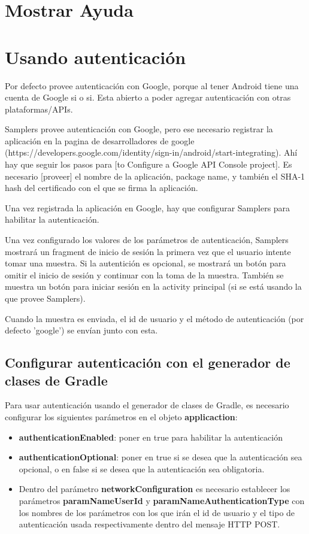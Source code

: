 \section{Mostrar Ayuda}

\section{Usando autenticación} \label{sec:usando_autenticacion}
Por defecto provee autenticación con Google, porque al tener Android tiene una cuenta de Google si o si.
Esta abierto a poder agregar autenticación con otras plataformas/APIs.

Samplers provee autenticación con Google, pero ese necesario registrar la aplicación en la pagina de desarrolladores de google (https://developers.google.com/identity/sign-in/android/start-integrating). Ahí hay que seguir los pasos para [to Configure a Google API Console project]. Es necesario [proveer] el nombre de la aplicación, package name, y también el SHA-1 hash del certificado con el que se firma la aplicación.

Una vez registrada la aplicación en Google, hay que configurar Samplers para habilitar la autenticación.

Una vez configurado los valores de los parámetros de autenticación, Samplers mostrará un fragment de inicio de sesión la primera vez que el usuario intente tomar una muestra. Si la autentición es opcional, se mostrará un botón para omitir el inicio de sesión y continuar con la toma de la muestra. También se muestra un botón para iniciar sesión en la activity principal (si se está usando la que provee Samplers).

Cuando la muestra es enviada, el id de usuario y el método de autenticación (por defecto 'google') se envían junto con esta.


\subsection{Configurar autenticación con el generador de clases de Gradle}

Para usar autenticación usando el generador de clases de Gradle, es necesario configurar los siguientes parámetros en el objeto \textbf{applicaction}:

\begin{itemize}

	\item \textbf{authenticationEnabled}: poner en true para habilitar la autenticación
		
	\item \textbf{authenticationOptional}: poner en true si se desea que la autenticación sea opcional, o en false si se desea que la autenticación sea obligatoria.
	
	\item Dentro del parámetro \textbf{networkConfiguration} es necesario establecer los parámetros \textbf{paramNameUserId} y \textbf{paramNameAuthenticationType} con los nombres de los parámetros con los que irán el id de usuario y el tipo de autenticación usada respectivamente dentro del mensaje HTTP POST.
	

\end{itemize}

